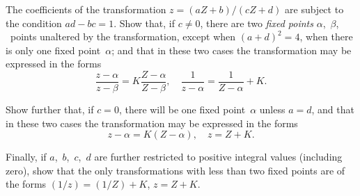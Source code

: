 The coefficients of the transformation $z = (aZ + b)/(cZ + d)$ are subject
to the condition $ad - bc = 1$.    Show that, if $c \neq 0$, there are two \emph{fixed points}
$\alpha$,~$\beta$, \ie\ points unaltered by the transformation, except when $(a + d)^{2} = 4$, when
there is only one fixed point~$\alpha$; and that in these two cases the transformation
may be expressed in the forms
\[
\frac{z - \alpha}{z - \beta} = K\frac{Z - \alpha}{Z - \beta},\quad
\frac{1}{z - \alpha} = \frac{1}{Z - \alpha} + K.
\]

Show further that, if $c = 0$, there will be one fixed point~$\alpha$ unless $a = d$,
and that in these two cases the transformation may be expressed in the
forms
\[
z - \alpha = K(Z - \alpha),\quad
z = Z + K.
\]

Finally, if $a$,~$b$,~$c$,~$d$ are further restricted to positive integral values (including
zero), show that the only transformations with less than two fixed
points are of the forms $(1/z) = (1/Z) + K$, $z = Z + K$. 

